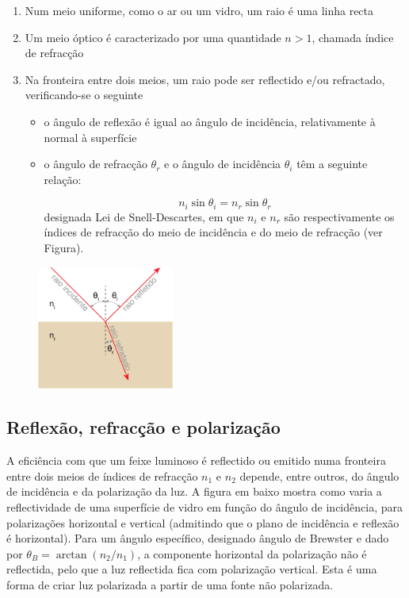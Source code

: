 \documentclass[a4paper,12pt]{article}      %
\begin{document}
\begin{enumerate}
\item Num meio uniforme, como o ar ou um vidro, um raio é uma linha recta
\item Um meio óptico é caracterizado por uma quantidade $n>1$, chamada índice de refracção
\item Na fronteira entre dois meios, um raio pode ser reflectido e/ou refractado, verificando-se o seguinte
\begin{itemize}
\item o ângulo de reflexão é igual ao ângulo de incidência, relativamente à normal à superfície
\item o ângulo de refracção $\theta_r$ e o ângulo de incidência $\theta_i$ têm a seguinte relação:

\begin{equation}
n_i\sin{\theta_i}=n_r\sin{\theta_r}
\end{equation}
designada Lei de Snell-Descartes, em que $n_i$ e $n_r$ são respectivamente os índices de refracção do meio de incidência e do meio de refracção (ver Figura).
\end{itemize}

\end{enumerate}

\begin{figure}
	[!hb]  \centering 
	\includegraphics[width=0.4\textwidth]{1-snell}
\end{figure}

\subsection{\sf Reflexão, refracção e polarização}

A eficiência com que um feixe luminoso é reflectido ou emitido numa fronteira entre dois meios de índices de refracção $n_1$ e $n_2$ depende, entre outros, do ângulo de incidência e da polarização da luz. A figura em baixo mostra como varia a reflectividade de uma superfície de vidro em função do ângulo de incidência, para polarizações horizontal e vertical (admitindo que o plano de incidência e reflexão é horizontal). Para um ângulo específico, designado ângulo de Brewster e dado por $\theta_B=\arctan(n_2/n_1)$, a componente horizontal da polarização não é reflectida, pelo que a luz reflectida fica com polarização vertical. Esta é uma forma de criar luz polarizada a partir de uma fonte não polarizada.
\end{document}
